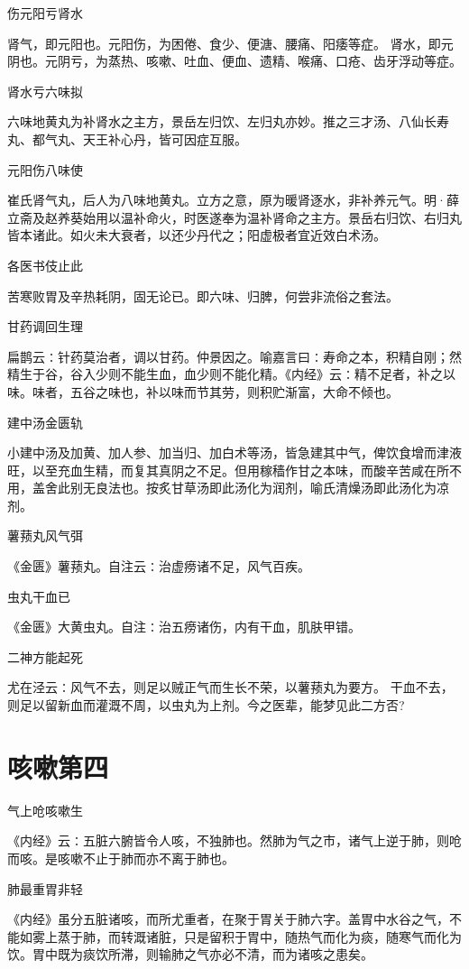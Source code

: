 \documentclass[a4paper,12pt,UTF8,twoside]{ctexbook}
\begin{document}
	伤元阳亏肾水
	
	肾气，即元阳也。元阳伤，为困倦、食少、便溏、腰痛、阳痿等症。
	肾水，即元阴也。元阴亏，为蒸热、咳嗽、吐血、便血、遗精、喉痛、口疮、齿牙浮动等症。
	
	肾水亏六味拟
	
	六味地黄丸为补肾水之主方，景岳左归饮、左归丸亦妙。推之三才汤、八仙长寿丸、都气丸、天王补心丹，皆可因症互服。
	
	元阳伤八味使
	
	崔氏肾气丸，后人为八味地黄丸。立方之意，原为暖肾逐水，非补养元气。明·薛立斋及赵养葵始用以温补命火，时医遂奉为温补肾命之主方。景岳右归饮、右归丸皆本诸此。如火未大衰者，以还少丹代之；阳虚极者宜近效白术汤。
	
	各医书伎止此
	
	苦寒败胃及辛热耗阴，固无论已。即六味、归脾，何尝非流俗之套法。
	
	甘药调回生理
	
	扁鹊云∶针药莫治者，调以甘药。仲景因之。喻嘉言曰∶寿命之本，积精自刚；然精生于谷，谷入少则不能生血，血少则不能化精。《内经》云∶精不足者，补之以味。味者，五谷之味也，补以味而节其劳，则积贮渐富，大命不倾也。
	
	建中汤金匮轨
	
	小建中汤及加黄、加人参、加当归、加白术等汤，皆急建其中气，俾饮食增而津液旺，以至充血生精，而复其真阴之不足。但用稼穑作甘之本味，而酸辛苦咸在所不用，盖舍此别无良法也。按炙甘草汤即此汤化为润剂，喻氏清燥汤即此汤化为凉剂。
	
	薯蓣丸风气弭
	
	《金匮》薯蓣丸。自注云∶治虚痨诸不足，风气百疾。
	
	虫丸干血已
	
	《金匮》大黄虫丸。自注∶治五痨诸伤，内有干血，肌肤甲错。
	
	二神方能起死
	
	尤在泾云∶风气不去，则足以贼正气而生长不荣，以薯蓣丸为要方。
	干血不去，则足以留新血而灌溉不周，以虫丸为上剂。今之医辈，能梦见此二方否?
	
	\chapter{咳嗽第四}
	气上呛咳嗽生

	《内经》云∶五脏六腑皆令人咳，不独肺也。然肺为气之市，诸气上逆于肺，则呛而咳。是咳嗽不止于肺而亦不离于肺也。
	
	肺最重胃非轻

	《内经》虽分五脏诸咳，而所尤重者，在聚于胃关于肺六字。盖胃中水谷之气，不能如雾上蒸于肺，而转溉诸脏，只是留积于胃中，随热气而化为痰，随寒气而化为饮。胃中既为痰饮所滞，则输肺之气亦必不清，而为诸咳之患矣。
	
\end{document}
